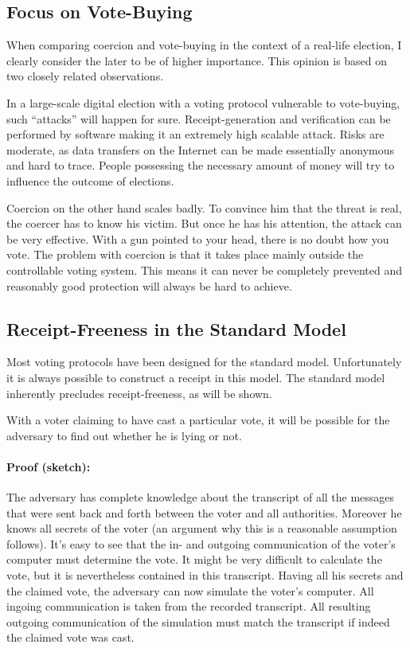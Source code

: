 \documentclass{article}
\begin{document}
\subsection{Focus on Vote-Buying}
When comparing coercion and vote-buying in the context of a real-life election, I clearly consider the later to be of higher importance. This opinion is based on two closely related observations.

In a large-scale digital election with a voting protocol vulnerable to vote-buying, such ``attacks'' will happen for sure. Receipt-generation and verification can be performed by software making it an extremely high scalable attack. Risks are moderate, as data transfers on the Internet can be made essentially anonymous and hard to trace. People possessing the necessary amount of money will try to influence the outcome of elections.

Coercion on the other hand scales badly. To convince him that the threat is real, the coercer has to know his victim. But once he has his attention, the attack can be very effective. With a gun pointed to your head, there is no doubt how you vote. The problem with coercion is that it takes place mainly outside the controllable voting system. This means it can never be completely prevented and reasonably good protection will always be hard to achieve.


\subsection{Receipt-Freeness in the Standard Model}
Most voting protocols have been designed for the standard model. Unfortunately it is always possible to construct a receipt in this model. The standard model inherently precludes receipt-freeness, as will be shown.

With a voter claiming to have cast a particular vote, it will be possible for the adversary to find out whether he is lying or not.

\paragraph{Proof (sketch):}
The adversary has complete knowledge about the transcript of all the messages that were sent back and forth between the voter and all authorities. Moreover he knows all secrets of the voter (an argument why this is a reasonable assumption follows).
It's easy to see that the in- and outgoing communication of the voter's computer must determine the vote. It might be very difficult to calculate the vote, but it is nevertheless contained in this transcript.
Having all his secrets and the claimed vote, the adversary can now simulate the voter's computer. All ingoing communication is taken from the recorded transcript. All resulting outgoing communication of the simulation must match the transcript if indeed the claimed vote was cast.
\end{document}
